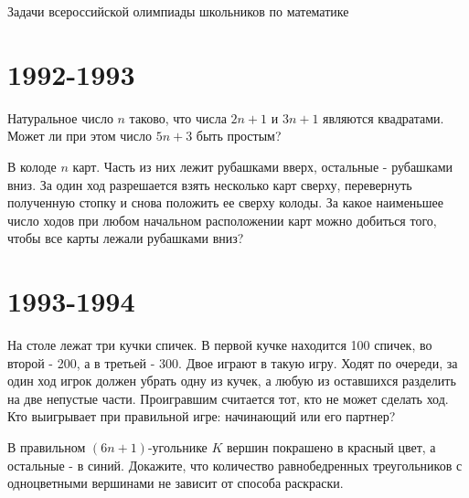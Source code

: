 \documentclass[11pt, a4paper]{template}
\begin{document}
\begin{titlepage}
  \begin{center}
	\Huge{Задачи всероссийской олимпиады школьников по математике
}
  \end{center}
\end{titlepage}

\chapter{1992-1993}

\begin{exercise}
Натуральное число $n$ таково, что числа $2n + 1$ и $3n + 1$ являются
квадратами. Может ли при этом число $5n + 3$ быть простым?
\end{exercise}

\begin{solution}

\end{solution}

\begin{exercise}
В колоде $n$ карт. Часть из них лежит рубашками вверх, остальные - рубашками вниз. За один ход разрешается взять несколько карт сверху, перевернуть полученную стопку и снова положить ее сверху колоды. За какое наименьшее число ходов при любом начальном расположении карт можно добиться того, чтобы все карты лежали рубашками вниз?
\end{exercise}

\chapter{1993-1994}

\begin{exercise}
На столе лежат три кучки спичек. В первой кучке находится 100 спичек, во второй - 200, а в третьей - 300. Двое играют в такую игру. Ходят по очереди, за один ход игрок должен убрать одну из кучек, а любую из оставшихся разделить на две непустые части. Проигравшим считается тот, кто не может сделать ход. Кто выигрывает при правильной игре: начинающий или его партнер?
\end{exercise}

\begin{exercise}
В правильном $(6n+1)$-угольнике $K$ вершин покрашено в красный цвет, а остальные - в синий. Докажите, что количество равнобедренных треугольников с одноцветными вершинами не зависит от способа раскраски.
\end{exercise}
\end{document}
